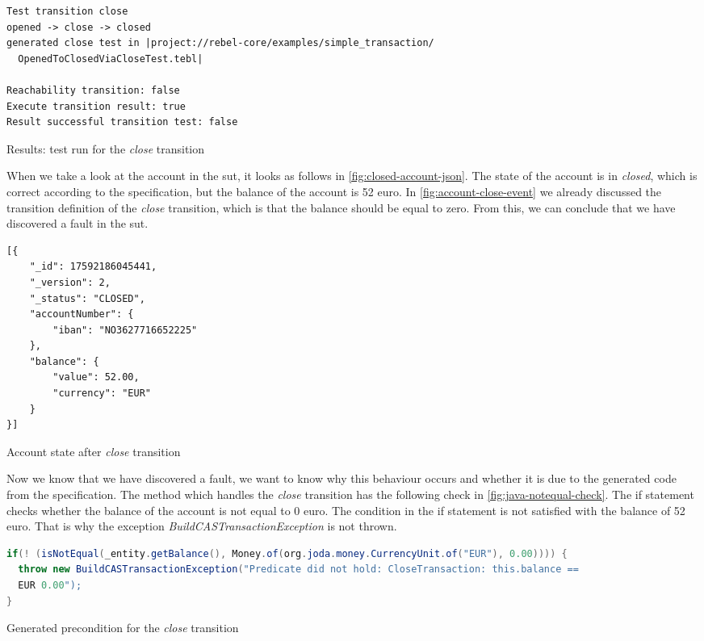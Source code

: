 \begin{sourcecode}[h!]
\begin{lstlisting}[]
Test transition close
opened -> close -> closed
generated close test in |project://rebel-core/examples/simple_transaction/
  OpenedToClosedViaCloseTest.tebl|

Reachability transition: false
Execute transition result: true
Result successful transition test: false
\end{lstlisting}
\caption{Results: test run for the \textit{close} transition}\label{fig:result-close-account}
\end{sourcecode}
\FloatBarrier

When we take a look at the account in the \gls{sut}, it looks as
follows in \autoref{fig:closed-account-json}. The state of the account is in
\textit{closed}, which is correct according to the specification, but the
balance of the account is 52 euro. In \autoref{fig:account-close-event} we
already discussed the transition definition of the \textit{close} transition,
which is that the balance should be equal to zero. From this, we can conclude
that we have discovered a fault in the \gls{sut}.

\begin{sourcecode}[h!]
\begin{lstlisting}[]
[{
	"_id": 17592186045441,
	"_version": 2,
	"_status": "CLOSED",
	"accountNumber": {
		"iban": "NO3627716652225"
	},
	"balance": {
		"value": 52.00,
		"currency": "EUR"
	}
}]
\end{lstlisting}
\caption{Account state after \textit{close} transition}\label{fig:closed-account-json}
\end{sourcecode}
\FloatBarrier

Now we know that we have discovered a fault, we want to know why this behaviour
occurs and whether it is due to the generated code from the specification. The
method which handles the \textit{close} transition has the following check in
\autoref{fig:java-notequal-check}. The if statement checks whether the balance
of the account is not equal to 0 euro. The condition in the if statement is not
satisfied with the balance of 52 euro. That is why the exception
\textit{BuildCASTransactionException} is not thrown.

\begin{sourcecode}[h!]
\begin{lstlisting}[language=Java]
if(! (isNotEqual(_entity.getBalance(), Money.of(org.joda.money.CurrencyUnit.of("EUR"), 0.00)))) {
  throw new BuildCASTransactionException("Predicate did not hold: CloseTransaction: this.balance ==
  EUR 0.00");
}
\end{lstlisting}
\caption{Generated precondition for the \textit{close} transition}\label{fig:java-notequal-check}
\end{sourcecode}
\FloatBarrier

